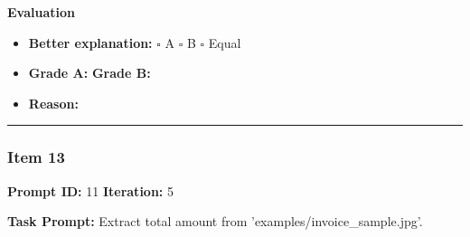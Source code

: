 \documentclass[11pt]{article}
\begin{document}
\vspace{1em}

\textbf{Evaluation}
\begin{itemize}
    \item \textbf{Better explanation:} \hspace{1em} $\square$ A \hspace{1em} $\square$ B \hspace{1em} $\square$ Equal
    \item \textbf{Grade A:} \underline{\hspace{2cm}} \hspace{1em} \textbf{Grade B:} \underline{\hspace{2cm}}
    \item \textbf{Reason:} \\[4.5em]
\end{itemize}

\vspace{1em}
\hrule
\vspace{1em}


\subsubsection*{Item 13}
\textbf{Prompt ID:} 11 \hfill \textbf{Iteration:} 5

\textbf{Task Prompt:} Extract total amount from 'examples/invoice\_sample.jpg'.
\end{document}
